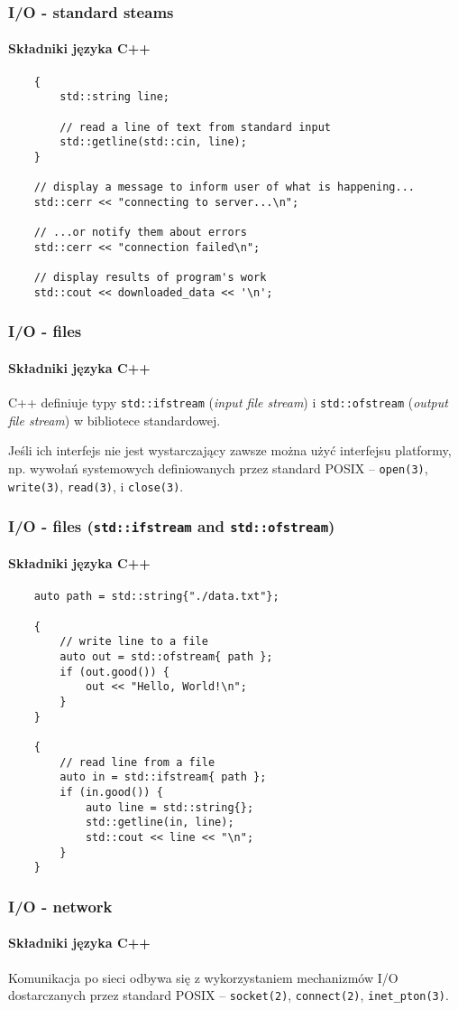 \documentclass[aspectratio=169]{beamer}
\begin{document}
\begin{frame}[fragile]
    \frametitle{I/O - standard steams}
    \framesubtitle{Składniki języka C++}

    {\scriptsize
    \begin{lstlisting}
    {
        std::string line;

        // read a line of text from standard input
        std::getline(std::cin, line);
    }

    // display a message to inform user of what is happening...
    std::cerr << "connecting to server...\n";

    // ...or notify them about errors
    std::cerr << "connection failed\n";

    // display results of program's work
    std::cout << downloaded_data << '\n';
    \end{lstlisting}}
\end{frame}

\begin{frame}
    \frametitle{I/O - files}
    \framesubtitle{Składniki języka C++}

    C++ definiuje typy {\tt std::ifstream} (\emph{input file stream}) i
    {\tt std::ofstream} (\emph{output file stream}) w bibliotece standardowej.

    \vspace{1em}

    Jeśli ich interfejs nie jest wystarczający zawsze można użyć interfejsu
    platformy, np. wywołań systemowych definiowanych przez standard POSIX --
    {\tt open(3)}, {\tt write(3)}, {\tt read(3)}, i {\tt close(3)}.
\end{frame}

\begin{frame}[fragile]
    \frametitle{I/O - files ({\tt std::ifstream} and {\tt std::ofstream})}
    \framesubtitle{Składniki języka C++}

    {\scriptsize
    \begin{lstlisting}
    auto path = std::string{"./data.txt"};

    {
        // write line to a file
        auto out = std::ofstream{ path };
        if (out.good()) {
            out << "Hello, World!\n";
        }
    }

    {
        // read line from a file
        auto in = std::ifstream{ path };
        if (in.good()) {
            auto line = std::string{};
            std::getline(in, line);
            std::cout << line << "\n";
        }
    }
    \end{lstlisting}}
\end{frame}

\begin{frame}
    \frametitle{I/O - network}
    \framesubtitle{Składniki języka C++}

    Komunikacja po sieci odbywa się z wykorzystaniem mechanizmów I/O
    dostarczanych przez standard POSIX -- {\tt socket(2)}, {\tt connect(2)},
    {\tt inet\_pton(3)}.
\end{frame}
\end{document}
